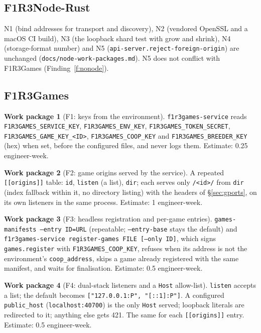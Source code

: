 \documentclass[11pt]{article}
\theoremstyle{definition}
\newtheorem{workpackage}{Work package}
\theoremstyle{remark}
\newcommand{\code}[1]{\texttt{#1}}
\newcommand{\Nd}{F1R3Node-Rust}
\newcommand{\Gm}{F1R3Games}
\newcommand{\Svc}{\code{f1r3games-service}}
\begin{document}
\subsection{\Nd{}}
N1 (bind addresses for transport and discovery), N2 (vendored OpenSSL and a macOS
CI build), N3 (the loopback shard test with grow and shrink), N4 (storage-format
number) and N5 (\code{api-server.reject-foreign-origin}) are unchanged
(\code{docs/node-work-packages.md}). N5 does not conflict with \Gm{}
(Finding~\ref{f:nonode}).

\subsection{\Gm{}}\label{sec:fwp}

\begin{workpackage}[F1: keys from the environment]\label{wp:f1}
\Svc{} reads \code{F1R3GAMES\_SERVICE\_KEY}, \code{F1R3GAMES\_ENV\_KEY},
\code{F1R3GAMES\_TOKEN\_SECRET}, \code{F1R3GAMES\_GAME\_KEY\_<ID>},
\code{F1R3GAMES\_COOP\_KEY} and \code{F1R3GAMES\_BREEDER\_KEY} (hex) when set, before
the configured files, and never logs them. Estimate: 0.25 engineer-week.
\end{workpackage}

\begin{workpackage}[F2: game origins served by the service]\label{wp:f2}
A repeated \code{[[origins]]} table: \code{id}, \code{listen} (a list), \code{dir};
each serves only \code{/<id>/} from \code{dir} (index fallback within it, no
directory listing) with the headers of \S\ref{sec:gports}, on its own listeners in
the same process. Estimate: 1 engineer-week.
\end{workpackage}

\begin{workpackage}[F3: headless registration and per-game entries]\label{wp:f3}
\code{games-manifests --entry ID=URL} (repeatable; \code{--entry-base} stays the
default) and \code{f1r3games-service register-games FILE [--only ID]}, which signs
\code{games.register} with \code{F1R3GAMES\_COOP\_KEY}, refuses when its address is not
the environment's \code{coop\_address}, skips a game already registered with the same
manifest, and waits for finalisation. Estimate: 0.5 engineer-week.
\end{workpackage}

\begin{workpackage}[F4: dual-stack listeners and a \code{Host} allow-list]\label{wp:f4}
\code{listen} accepts a list; the default becomes
\code{["127.0.0.1:P", "[::1]:P"]}. A configured \code{public\_host}
(\code{localhost:40700}) is the only \code{Host} served; loopback literals are
redirected to it; anything else gets 421. The same for each \code{[[origins]]}
entry. Estimate: 0.5 engineer-week.
\end{workpackage}
\end{document}
